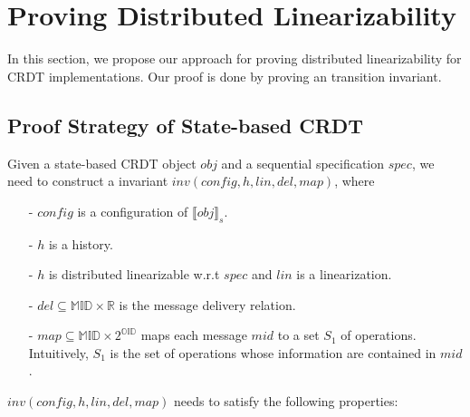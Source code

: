 
\section{Proving Distributed Linearizability}
\label{sec:proving distributed linearizability}

In this section, we propose our approach for proving distributed linearizability for CRDT implementations. Our proof is done by proving an transition invariant.


\subsection{Proof Strategy of State-based CRDT}
\label{subsec:proof strategy of operation-based CRDT}

Given a state-based CRDT object $\mathit{obj}$ and a sequential specification $\mathit{spec}$, we need to construct a invariant $\mathit{inv}(\mathit{config},h,\mathit{lin},\mathit{del},\mathit{map})$, where

\begin{itemize}
\setlength{\itemsep}{0.5pt}
\item[-] $\mathit{config}$ is a configuration of $\llbracket \mathit{obj} \rrbracket_s$.

\item[-] $h$ is a history. 

\item[-] $h$ is distributed linearizable w.r.t $\mathit{spec}$ and $\mathit{lin}$ is a linearization.

\item[-] $\mathit{del} \subseteq \mathbb{MID} \times \mathbb{R}$ is the message delivery relation.

\item[-] $\mathit{map} \subseteq \mathbb{MID} \times 2^{\mathbb{OID}}$ maps each message $\mathit{mid}$ to a set $S_1$ of operations. Intuitively, $S_1$ is the set of operations whose information are contained in $\mathit{mid}$. 
\end{itemize}  

$\mathit{inv}(\mathit{config},h,\mathit{lin},\mathit{del},\mathit{map})$ needs to satisfy the following properties:

